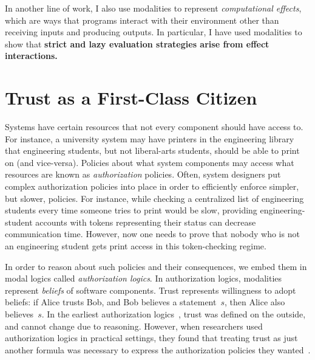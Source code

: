 \documentclass{article}
\theoremstyle{definition}
\begin{document}
In another line of work, I also use modalities to represent \emph{computational effects}, which are ways that programs interact with their environment other than receiving inputs and producing outputs.
In particular, I have used modalities to show that \textbf{strict and lazy evaluation strategies arise from effect interactions.}

\section*{Trust as a First-Class Citizen}

Systems have certain resources that not every component should have access to.
For instance, a university system may have printers in the engineering library that engineering students, but not liberal-arts students, should be able to print on (and vice-versa).
Policies about what system components may access what resources are known as \emph{authorization} policies.
Often, system designers put complex authorization policies into place in order to efficiently enforce simpler, but slower, policies.
For instance, while checking a centralized list of engineering students every time someone tries to print would be slow, providing engineering-student accounts with tokens representing their status can decrease communication time.
However, now one needs to prove that nobody who is not an engineering student gets print access in this token-checking regime.

In order to reason about such policies and their consequences, we embed them in modal logics called \emph{authorization logics}.
In authorization logics, modalities represent \emph{beliefs} of software components.
Trust represents willingness to adopt beliefs: if Alice trusts Bob, and Bob believes a statement~$s$, then Alice also believes~$s$.
In the earliest authorization logics~\citep{Abadi06}, trust was defined on the outside, and cannot change due to reasoning.
However, when researchers used authorization logics in practical settings, they found that treating trust as just another formula was necessary to express the authorization policies they wanted~\citep{SchneiderWS11}.

\iffalse
Practical uses of authorization logics almost always use a technique called \emph{proof-carrying authorization}~\citep{WhiteheadAN04,SirerDBRSWWS11,SkalkaRDKGDSF19}.
This uses authorization logics not only to reason about policies but to enforce them: when a component requests access to a resource, they must supply an authorization-logic proof showing that they are allowed access.
This implementation breaks the connection between systems and the mathematical models usually used to interpret authorization logics.
These models assume that components get their beliefs by considering what must be true given observations of the world around them.
However, proof-carrying authorization systems store components' beliefs in a data store.
\fi
\end{document}

